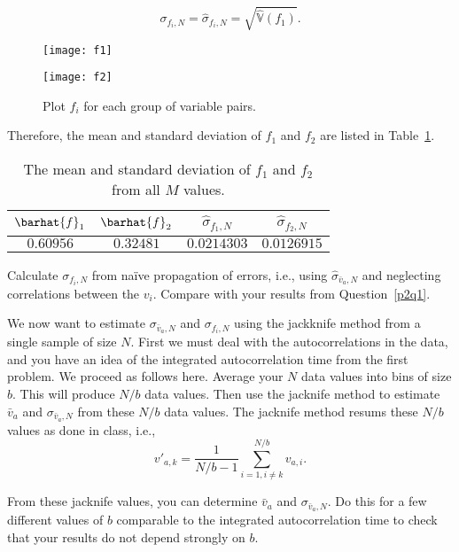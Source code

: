 \begin{equation}
    \sigma_{f_i,N} = \hat{\sigma}_{f_i,N} = \sqrt{\hat{\mathbb{V}}(f_1)}.
\end{equation}

\begin{figure}
    \centering
    \begin{minipage}[t]{0.8\linewidth}
        \centering
        \texttt{[image: f1]}
        \label{fig:fi:a}
    \end{minipage}
    \hfill
    \begin{minipage}[t]{0.8\linewidth}
        \centering
        \texttt{[image: f2]}
        \label{fig:fi:b}
    \end{minipage}
    \caption{Plot \(f_i\) for each group of variable pairs.}
    \label{fig:fi}
\end{figure}

Therefore, the mean and standard deviation of \(f_1\) and
\(f_2\) are listed in Table~\ref{tab:stdf1f2}.

\begin{table}
    \centering
    \caption{The mean and standard deviation of \(f_1\) and \(f_2\) from all \(M\) values.}
    \label{tab:stdf1f2}
    \begin{tabular}{@{}cccc@{}}
        \toprule
        \(\barhat{f}_1\) & \(\barhat{f}_2\) & \(\hat{\sigma}_{f_1,N}\) & \(\hat{\sigma}_{f_2,N}\) \\
        \midrule
        \(0.60956\)      & \(0.32481\)      & \(0.0214303\)            & \(0.0126915\)            \\
        \bottomrule
    \end{tabular}
\end{table}


\Question{} Calculate \(\sigma_{f_i,N}\) from naïve propagation of errors, i.e., using
\(\hat{\sigma}_{\bar{v}_a,N}\) and neglecting correlations between the \(v_i\). Compare with
your results from Question~\ref{p2q1}.

\Answer{}



\Question{} We now want to estimate \(\sigma_{\bar{v}_a,N}\) and \(\sigma_{f_i,N}\) using
the jackknife method from a single sample of size \(N\).
First we must deal with the autocorrelations in the data, and you have an idea of the
integrated autocorrelation time from the first problem. We proceed as follows here. Average
your \(N\) data values into bins of size \(b\). This will produce \(N/b\) data values.
Then use the jacknife method to estimate \(\bar{v}_a\) and \(\sigma_{\bar{v}_a,N}\) from
these \(N/b\) data values. The jacknife method resums these \(N/b\) values as done in class,
i.e.,
%
\begin{equation}
    v'_{a,k} = \frac{ 1 }{ N / b - 1 } \sum_{i=1, i \neq k}^{N/b} v_{a,i}.
\end{equation}

From these jacknife values, you can determine \(\bar{v}_a\) and \(\sigma_{\bar{v}_a,N}\).
Do this for a few different values of \(b\) comparable to the integrated autocorrelation
time to check that your results do not depend strongly on \(b\).

